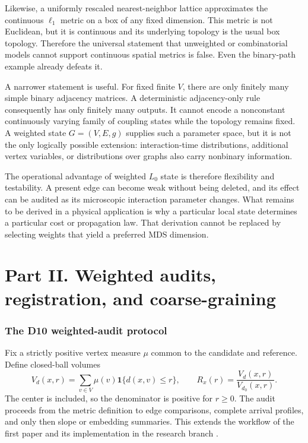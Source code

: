\documentclass[11pt,letterpaper]{article}
\theoremstyle{definition}
\theoremstyle{remark}
\newcommand{\one}{\mathbf 1}
\begin{document}
Likewise, a uniformly rescaled nearest-neighbor lattice approximates the continuous $\ell_1$ metric on a box of any fixed dimension. This metric is not Euclidean, but it is continuous and its underlying topology is the usual box topology. Therefore the universal statement that unweighted or combinatorial models cannot support continuous spatial metrics is false. Even the binary-path example already defeats it.

A narrower statement is useful. For fixed finite $V$, there are only finitely many simple binary adjacency matrices. A deterministic adjacency-only rule consequently has only finitely many outputs. It cannot encode a nonconstant continuously varying family of coupling states while the topology remains fixed. A weighted state $G=(V,E,g)$ supplies such a parameter space, but it is not the only logically possible extension: interaction-time distributions, additional vertex variables, or distributions over graphs also carry nonbinary information.

The operational advantage of weighted $L_0$ state is therefore flexibility and testability. A present edge can become weak without being deleted, and its effect can be audited as its microscopic interaction parameter changes. What remains to be derived in a physical application is why a particular local state determines a particular cost or propagation law. That derivation cannot be replaced by selecting weights that yield a preferred MDS dimension.

\part*{Part II. Weighted audits, registration, and coarse-graining}

\section{The D10 weighted-audit protocol}\label{sec:audit}
Fix a strictly positive vertex measure $\mu$ common to the candidate and reference. Define closed-ball volumes
\begin{equation}
 V_d(x,r)=\sum_{v\in V}\mu(v)\one\{d(x,v)\leq r\},\qquad
 R_x(r)=\frac{V_d(x,r)}{V_{d_0}(x,r)}.
 \label{eq:volume}
\end{equation}
The center is included, so the denominator is positive for $r\geq0$. The audit proceeds from the metric definition to edge comparisons, complete arrival profiles, and only then slope or embedding summaries. This extends the workflow of the first paper and its implementation in the research branch \cite{leblond2026a,leblondWeighted}.
\end{document}
